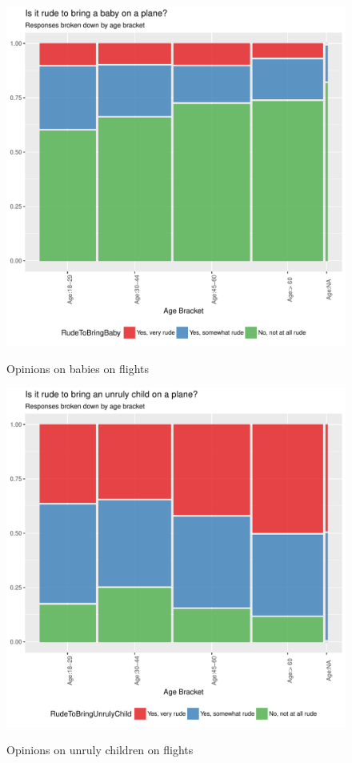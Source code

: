 \documentclass[DIV=calc, paper=a4, fontsize=10pt, twocolumn]{scrartcl}	 %
\begin{document}
\begin{figure}[h!]
\caption{Opinions on babies on flights}
\centering
\includegraphics{flying-age_baby}
\label{fig: age_baby}
\end{figure}

\begin{figure}[h!]
\caption{Opinions on unruly children on flights}
\centering
\includegraphics{flying-age_child}
\label{fig: age_child}
\end{figure}
\end{document}
